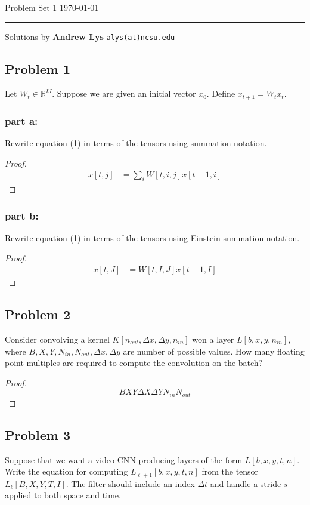 \documentclass{amsart}
\newcommand{\rr}{\mathbb R}    %
\theoremstyle{definition}
\begin{document}
\noindent
Problem Set 1  \hfill \today  %
\smallskip
\hrule
\smallskip
\noindent
Solutions by {\bf Andrew Lys} \qquad   %
  {\tt alys(at)ncsu.edu}

\vspace{0.5cm}
\subsection*{Problem 1}
Let $W_t \in \rr^{IJ}$. Suppose we are given an initial vector $x_0$. Define $x_{t + 1} = W_t x_t$. 
\subsubsection*{part a:}
Rewrite equation (1) in terms of the tensors using summation notation.
\begin{proof}
   \begin{align*}
    x[t, j] &= \sum_{i} W[t, i, j] x[t - 1, i]
   \end{align*}
\end{proof}
\subsubsection*{part b:}
Rewrite equation (1) in terms of the tensors using Einstein summation notation.
\begin{proof}
    \begin{align*}
        x[t, J] &= W[t, I, J] x[t - 1, I]
    \end{align*}
\end{proof}
\subsection*{Problem 2}
Consider convolving a kernel $K[n_{out}, \Delta x, \Delta y, n_{in}]$ won a layer $L[b, x, y, n_{in}]$, where $B, X, Y, N_{in}, N_{out}, \Delta x, \Delta y$ are number of possible values. 
How many floating point multiples are required to compute the convolution on the batch?
\begin{proof}
    \[
    B X Y \Delta X \Delta Y N_{in}N_{out}
    \]
\end{proof}
\subsection*{Problem 3}
Suppose that we want a video CNN producing layers of the form $L[b, x, y, t, n]$. 
Write the equation for computing $L_{\ell + 1}[b, x, y, t, n]$ from the tensor $L_{\ell}[B, X, Y, T, I]$.
The filter should include an index $\Delta t$ and handle a stride $s$ applied to both space and time. 
\end{document}
